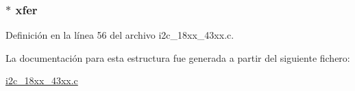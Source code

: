 \subsubsection[{\texorpdfstring{xfer}{xfer}}]{$\ast$ xfer}\hypertarget{structi2c__slave__interface_a3d13ba449bbd99670d3599a6eda5f4ec}{}\label{structi2c__slave__interface_a3d13ba449bbd99670d3599a6eda5f4ec}


Definición en la línea 56 del archivo i2c\+\_\+18xx\+\_\+43xx.\+c.



La documentación para esta estructura fue generada a partir del siguiente fichero\+:\begin{DoxyCompactItemize}
\item 
\hyperlink{i2c__18xx__43xx_8c}{i2c\+\_\+18xx\+\_\+43xx.\+c}\end{DoxyCompactItemize}
